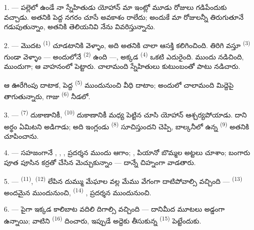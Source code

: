 \VUsaut{3.0mm}

1. --- పల్లెలో ఉండే నా స్నేహితుడు యోహాన్ మా ఇంట్లో మూడు రోజులు గడిపేందుకు వచ్చాడు.
 అతనికి పెద్ద నగరం చూసే అవకాశం రాలేదు; అందుకే మా రోజులన్నీ తిరుగుతూనే
గడుపుతున్నాం, అతనికి తెలియనివి నేను వివరిస్తున్నాను.

2. --- మొదట  \textsuperscript{(1)} చూడటానికి వెళ్ళాం, అది అతనికి చాలా
ఆసక్తి కలిగించింది. తిరిగి వస్తూ  \textsuperscript{(3)} గుండా వెళ్ళాం —
అందులోనే  \textsuperscript{(2)} ఉంది —, అక్కడ
 \textsuperscript{(4)} ఒకటి ఎదురైంది.  ముందు
 నడిచింది,  ముందుగా; ఆ వాహనంలో
 పెట్టారు. చాలామంది స్నేహితులు  కుటుంబంతో పాటు
నడిచారు.

ఆ ఊరేగింపు దాటాక, పెద్ద  \textsuperscript{(5)} ముందునుంచి వీధి దాటాం;
అందులో చాలామంది  మిద్దెపై  తాగుతున్నారు, గాజు
 \textsuperscript{(6)} నీడలో.

3. ---  \textsuperscript{(7)} దుకాణానికీ,
 \textsuperscript{(10)} దుకాణానికీ మధ్య పెట్టిన
 చూసి యోహాన్ ఆశ్చర్యపోయాడు. దాని అర్థం ఏమిటని అడిగాడు; అది ఇంగ్లండు
 \textsuperscript{(8)} సూచిస్తుందని చెప్పి, బాల్కనీలో ఉన్న
 \textsuperscript{(9)} అతనికి చూపించాను.

\VUsaut{3.0mm}

4. --- సహజంగానే , , ,
 ప్రదర్శన ముందు ఆగాం; , పియానో
 బొమ్మల అట్టలు చూశాం; బంగారు పూత పూసిన కర్రతో చేసిన 
మెచ్చుకున్నాం — దాన్నే చిహ్నంగా వాడతారు.

5. ---  \textsuperscript{(11)}, 
\textsuperscript{(12)} లేపిన దుమ్ము మేఘాల వల్ల మేము వేగంగా దాటిపోవాల్సి వచ్చింది —
 \textsuperscript{(13)} అందమైన  ముందునుంచి,
 \textsuperscript{(14)} ,  ప్రదర్శన
ముందునుంచి.

6. --- పైగా ఇక్కడ కాలిబాట వదిలి దిగాల్సి వచ్చింది — దానిమీద మూటలు అడ్డంగా ఉన్నాయి; వాటిని
 \textsuperscript{(16)} దించారు, ఇప్పుడే అద్దెకు తీసుకున్న
 \textsuperscript{(15)} పెట్టేందుకు.


